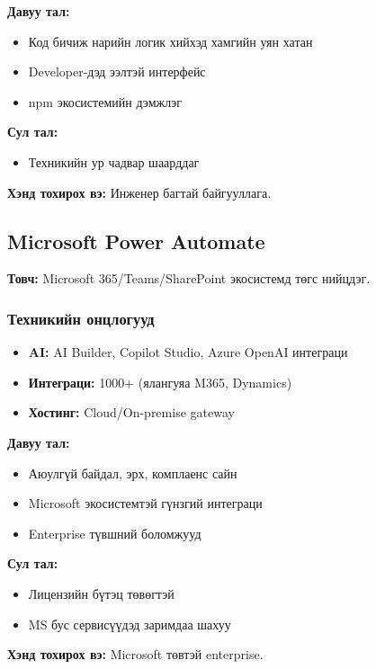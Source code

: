 {\textbf{Давуу тал:}}
\begin{itemize}
    \item Код бичиж нарийн логик хийхэд хамгийн уян хатан
    \item Developer-дэд ээлтэй интерфейс
    \item npm экосистемийн дэмжлэг
\end{itemize}

{\textbf{Сул тал:}}
\begin{itemize}
    \item Техникийн ур чадвар шаарддаг
\end{itemize}

\textbf{Хэнд тохирох вэ:} Инженер багтай байгууллага.

\subsection{Microsoft Power Automate}

\textbf{Товч:} Microsoft 365/Teams/SharePoint экосистемд төгс нийцдэг.

\subsubsection{Техникийн онцлогууд}
\begin{itemize}
    \item \textbf{AI:} AI Builder, Copilot Studio, Azure OpenAI интеграци
    \item \textbf{Интеграци:} 1000+ (ялангуяа M365, Dynamics)
    \item \textbf{Хостинг:} Cloud/On-premise gateway
\end{itemize}


{\textbf{Давуу тал:}}
\begin{itemize}
    \item Аюулгүй байдал, эрх, комплаенс сайн
    \item Microsoft экосистемтэй гүнзгий интеграци
    \item Enterprise түвшний боломжууд
\end{itemize}

{\textbf{Сул тал:}}
\begin{itemize}
    \item Лицензийн бүтэц төвөгтэй
    \item MS бус сервисүүдэд заримдаа шахуу
\end{itemize}

\textbf{Хэнд тохирох вэ:} Microsoft төвтэй enterprise.